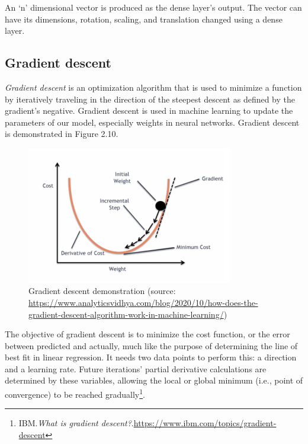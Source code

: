 An `n' dimensional vector is produced as the dense layer's output. The vector can have its dimensions, rotation, scaling, and translation changed using a dense layer. 

\subsection{Gradient descent}
\label{subsec:gradient_descent}
\hspace{0.5cm}\emph{Gradient descent} is an optimization algorithm that is used to minimize a function by iteratively traveling in the direction of the steepest descent as defined by the gradient's negative. Gradient descent is used in machine learning to update the parameters of our model, especially weights in neural networks. Gradient descent is demonstrated in Figure 2.10. \\ 
\begin{figure}[!h]
	\centering
	\includegraphics[width=\linewidth, height=6cm,keepaspectratio]{figures/gradient descent.png}
   \caption{Gradient descent demonstration (source: \url{https://www.analyticsvidhya.com/blog/2020/10/how-does-the-gradient-descent-algorithm-work-in-machine-learning/})}
\end{figure}

The objective of gradient descent is to minimize the cost function, or the error between predicted and actually, much like the purpose of determining the line of best fit in linear regression. It needs two data points to perform this: a direction and a learning rate. Future iterations' partial derivative calculations are determined by these variables, allowing the local or global minimum (i.e., point of convergence) to be reached gradually\footnote{IBM.\textit{What is gradient descent?}.\url{https://www.ibm.com/topics/gradient-descent}}.
